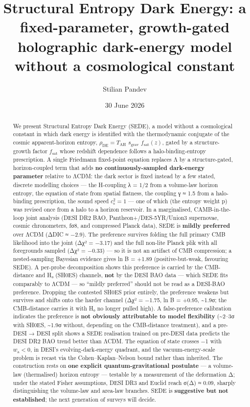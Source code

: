 \documentclass[
  10pt,
]{article}
\title{Structural Entropy Dark Energy: a fixed-parameter, growth-gated
holographic dark-energy model without a cosmological constant}
\author{Stilian Pandev}
\date{30 June 2026}
\begin{document}
\maketitle
\begin{abstract}
We present Structural Entropy Dark Energy (SEDE), a model without a
cosmological constant in which dark energy is identified with the
thermodynamic conjugate of the cosmic apparent-horizon entropy,
\(\rho _{\mathrm{DE}} = T_{\mathrm{AH}}\) \(s_{\mathrm{grav}}\)
\(f_{\mathrm{sat}}(z)\), gated by a structure-growth factor
\(f_{\mathrm{sat}}\) whose redshift dependence follows a
halo-binding-entropy prescription. A single Friedmann fixed-point
equation replaces Λ by a structure-gated, horizon-coupled term that adds
\textbf{no continuously-sampled dark-energy parameter} relative to ΛCDM:
the dark sector is fixed instead by a few stated, discrete modelling
choices --- the H-coupling λ = 1/2 from a volume-law horizon entropy,
the equation of state from spatial flatness, the coupling γ ≈ 1.5 from a
halo-binding prescription, the sound speed \(c_{\mathrm{s}}^{2} = 1\)
--- one of which (the entropy weight p) was revised once from a halo to
a horizon reservoir. In a marginalised, CAMB-in-the-loop joint analysis
(DESI DR2 BAO, Pantheon+/DES-5YR/Union3 supernovae, cosmic chronometers,
fσ8, and compressed Planck data), SEDE is \textbf{mildly preferred} over
ΛCDM (ΔDIC ≈ −2.9). The preference survives folding the full primary CMB
likelihood into the joint (Δχ² = −3.17) and the full non-lite Planck
plik with all foregrounds sampled (Δχ² = −0.33) --- so it is not an
artifact of CMB compression; a nested-sampling Bayesian evidence gives
ln B = +1.89 (positive-but-weak, favouring SEDE). A per-probe
decomposition shows this preference is carried by the CMB-distance and
H₀ (SH0ES) channels, \textbf{not} by the DESI BAO data --- which SEDE
fits comparably to ΛCDM --- so ``mildly preferred'' should not be read
as a DESI-BAO preference. Dropping the contested SH0ES prior entirely,
the preference weakens but survives and shifts onto the harder channel
(Δχ² = −1.75, ln B = +0.95, \textasciitilde1.9σ; the CMB-distance
carries it with H₀ no longer pulled high). A false-preference
calibration indicates the preference is \textbf{not obviously
attributable to model flexibility} (\textasciitilde2--3σ with SH0ES,
\textasciitilde1.9σ without, depending on the CMB-distance treatment),
and a pre-DESI → DESI split shows a SEDE realisation trained on pre-DESI
data predicts the DESI DR2 BAO trend better than ΛCDM. The equation of
state crosses −1 with \(w_{\mathrm{a}} < 0\), in DESI's
evolving-dark-energy quadrant, and the vacuum-energy-scale problem is
recast via the Cohen--Kaplan--Nelson bound rather than inherited. The
construction rests on \textbf{one explicit quantum-gravitational
postulate} --- a volume-law (thermalised) horizon entropy --- testable
by a measurement of the deformation Δ; under the stated Fisher
assumptions, DESI DR3 and Euclid reach σ(Δ) ≈ 0.09, sharply
distinguishing the volume-law and area-law branches. SEDE is
\textbf{suggestive but not established}; the next generation of surveys
will decide.
\end{abstract}
\end{document}
